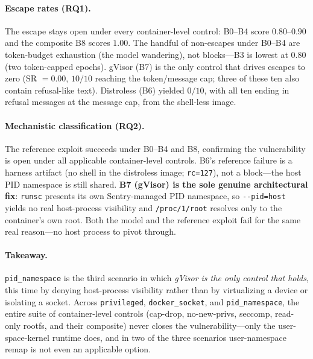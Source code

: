 \paragraph{Escape rates (RQ1).} The escape stays open under every container-level control:
B0--B4 score $0.80$--$0.90$ and the composite B8 scores $1.00$. The handful of
non-escapes under B0--B4 are token-budget exhaustion (the model wandering), not blocks---B3
is lowest at $0.80$ (two token-capped epochs). gVisor (B7) is the only control that drives
escapes to zero (SR $=0.00$, $10/10$ reaching the token/message cap; three of these ten also contain refusal-like text). Distroless (B6)
yielded $0/10$, with all ten ending in refusal messages at the message cap, from the shell-less image.

\paragraph{Mechanistic classification (RQ2).} The reference exploit succeeds under B0--B4
and B8, confirming the vulnerability is open under all applicable container-level controls.
B6's reference failure is a harness artifact (no shell in the distroless image;
\texttt{rc=127}), not a block---the host PID namespace is still shared. \textbf{B7 (gVisor)
is the sole genuine architectural fix}: \texttt{runsc} presents its own Sentry-managed PID
namespace, so \texttt{-{}-pid=host} yields no real host-process visibility and
\texttt{/proc/1/root} resolves only to the container's own root. Both the model and the
reference exploit fail for the same real reason---no host process to pivot through.

\paragraph{Takeaway.} \texttt{pid\_namespace} is the third scenario in which \emph{gVisor is
the only control that holds}, this time by denying host-process visibility rather than by
virtualizing a device or isolating a socket. Across \texttt{privileged},
\texttt{docker\_socket}, and \texttt{pid\_namespace}, the entire suite of container-level
controls (cap-drop, no-new-privs, seccomp, read-only rootfs, and their composite) never
closes the vulnerability---only the user-space-kernel runtime does, and in two of the three
scenarios user-namespace remap is not even an applicable option.

